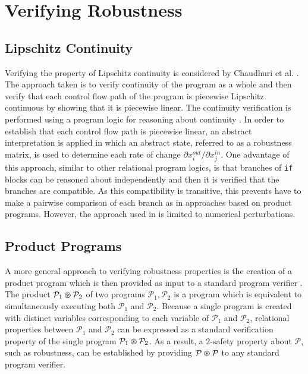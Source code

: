 \documentclass{llncs}
\begin{document}
\section{Verifying Robustness}

\subsection{Lipschitz Continuity}

Verifying the property of Lipschitz continuity is considered by Chaudhuri et al. \cite{chaudhuri10,chaudhuri11}.  The approach taken is to verify continuity of the program as a whole and then verify that each control flow path of the program is piecewise Lipschitz continuous by showing that it is piecewise linear.  The continuity verification is performed using a program logic for reasoning about continuity \cite{chaudhuri10}.  In order to establish that each control flow path is piecewise linear, an abstract interpretation is applied in which an abstract state, referred to as a robustness matrix, is used to determine each rate of change \(\partial x_{i}^{out}/\partial x_{j}^{in}\).  One advantage of this approach, similar to other relational program logics, is that branches of \verb!if! blocks can be reasoned about independently and then it is verified that the branches are compatible.  As this compatibility is transitive, this prevents have to make a pairwise comparison of each branch as in approaches based on product programs.  However, the approach used in \cite{chaudhuri10,chaudhuri11} is limited to numerical perturbations. 

\subsection{Product Programs}

A more general approach to verifying robustness properties is the creation of a product program which is then provided as input to a standard program verifier \cite{bartheproduct}.  The product \(\mathcal{P}_{1} \varoast \mathcal{P}_{2}\) of two programs \(\mathcal{P}_{1}, \mathcal{P}_{2}\) is a program which is equivalent to simultaneously executing both \(\mathcal{P}_{1}\) and \(\mathcal{P}_{2}\).  Because a single program is created with distinct variables corresponding to each variable of \(\mathcal{P}_{1}\) and \(\mathcal{P}_{2}\), relational properties between \(\mathcal{P}_{1}\) and \(\mathcal{P}_{2}\) can be expressed as a standard verification property of the single program \(\mathcal{P}_{1} \varoast \mathcal{P}_{2}\).  As a result, a \(2\)-safety property about \(\mathcal{P}\), such as robustness, can be established by providing \(\mathcal{P} \varoast \mathcal{P}\) to any standard program verifier.
\end{document}
